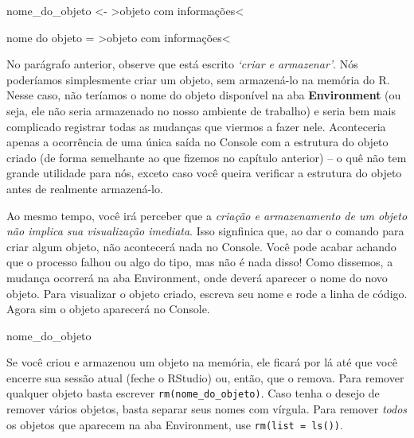 \documentclass[
  letterpaper,
  DIV=11,
  numbers=noendperiod]{scrreprt}
\newenvironment{Shaded}{\begin{snugshade}}{\end{snugshade}}
\newcommand{\ErrorTok}[1]{\textcolor[rgb]{0.68,0.00,0.00}{#1}}
\newcommand{\NormalTok}[1]{\textcolor[rgb]{0.00,0.23,0.31}{#1}}
\newcommand{\OtherTok}[1]{\textcolor[rgb]{0.00,0.23,0.31}{#1}}
\newcommand{\SpecialCharTok}[1]{\textcolor[rgb]{0.37,0.37,0.37}{#1}}
\begin{document}
\begin{Shaded}
\begin{Highlighting}[]
\NormalTok{nome\_do\_objeto }\OtherTok{\textless{}{-}} \ErrorTok{\textgreater{}}\NormalTok{objeto com informações}\SpecialCharTok{\textless{}}
  
\NormalTok{nome do objeto }\OtherTok{=}  \ErrorTok{\textgreater{}}\NormalTok{objeto com informações}\SpecialCharTok{\textless{}}
\end{Highlighting}
\end{Shaded}

No parágrafo anterior, observe que está escrito \emph{`criar e
armazenar'}. Nós poderíamos simplesmente criar um objeto, sem
armazená-lo na memória do R. Nesse caso, não teríamos o nome do objeto
disponível na aba \textbf{Environment} (ou seja, ele não seria
armazenado no nosso ambiente de trabalho) e seria bem mais complicado
registrar todas as mudanças que viermos a fazer nele. Aconteceria apenas
a ocorrência de uma única saída no Console com a estrutura do objeto
criado (de forma semelhante ao que fizemos no capítulo anterior) -- o
quê não tem grande utilidade para nós, exceto caso você queira verificar
a estrutura do objeto antes de realmente armazená-lo.

Ao mesmo tempo, você irá perceber que a \emph{criação e armazenamento de
um objeto não implica sua visualização imediata}. Isso signfinica que,
ao dar o comando para criar algum objeto, não acontecerá nada no
Console. Você pode acabar achando que o processo falhou ou algo do tipo,
mas não é nada disso! Como dissemos, a mudança ocorrerá na aba
Environment, onde deverá aparecer o nome do novo objeto. Para visualizar
o objeto criado, escreva seu nome e rode a linha de código. Agora sim o
objeto aparecerá no Console.

\begin{Shaded}
\begin{Highlighting}[]
\NormalTok{nome\_do\_objeto}
\end{Highlighting}
\end{Shaded}

Se você criou e armazenou um objeto na memória, ele ficará por lá até
que você encerre sua sessão atual (feche o RStudio) ou, então, que o
remova. Para remover qualquer objeto basta escrever
\texttt{rm(nome\_do\_objeto)}. Caso tenha o desejo de remover vários
objetos, basta separar seus nomes com vírgula. Para remover \emph{todos}
os objetos que aparecem na aba Environment, use
\texttt{rm(list\ =\ ls())}.
\end{document}
